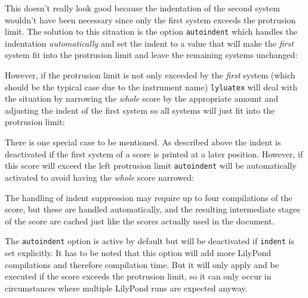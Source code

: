 \documentclass{scrartcl}
\begin{document}
This doesn't really look good because the indentation of the second system
wouldn't have been necessary since only the first system exceeds the protrusion
limit. The solution to this situation is the option \texttt{autoindent} which
handles the indentation \emph{automatically} and set the indent to a value that
will make the \emph{first} system fit into the protrusion limit and leave the
remaining systems unchanged:



However, if the protrusion limit is not only exceeded by the \emph{first} system
(which should be the typical case due to the instrument name) \texttt{lyluatex}
will deal with the situation by narrowing the \emph{whole} score by the
appropriate amount and adjusting the indent of the first system so all systems
will just fit into the protrusion limit:


There is one special case to be mentioned. As described above the indent is
deactivated if the first system of a score is printed at a later position.
However, if this score will exceed the left protrusion limit \texttt{autoindent}
will be automatically activated to avoid having the \emph{whole} score narrowed:



The handling of indent suppression may require up to four compilations of the
score, but these are handled automatically, and the resulting intermediate
stages of the score are cached just like the scores actually used in the
document.

The \texttt{autoindent} option is active by default but will be deactivated if
\texttt{indent} is set explicitly. It has to be noted that this option will add
more LilyPond compilations and therefore compilation time. But it will only
apply and be executed if the score exceeds the protrusion limit, so it can only
occur in circumstances where multiple LilyPond runs are expected anyway.
\end{document}
